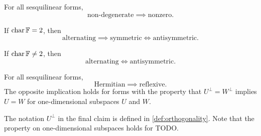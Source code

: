 \begin{lemma}
    \begin{enumlemma}
        \item For all sesquilinear forms,
        \begin{equation*}
            \text{non-degenerate}
                \implies \text{nonzero}.
        \end{equation*}

        \item If $\operatorname{char} \mathbb{F} = 2$, then
        \begin{equation*}
            \text{alternating}
                \implies \text{symmetric}
                \iff \text{antisymmetric}.
        \end{equation*}

        \item If $\operatorname{char} \mathbb{F} \neq 2$, then
        \begin{equation*}
            \text{alternating}
                \iff \text{antisymmetric}.
        \end{equation*}

        \item \label{enum:Hermitian-implies-reflexive} For all sesquilinear forms,
        \begin{equation*}
            \text{Hermitian}
                \implies \text{reflexive}.
        \end{equation*}
        The opposite implication holds for forms with the property that $U^\perp = W^\perp$ implies $U = W$ for one-dimensional subspaces $U$ and $W$.
    \end{enumlemma}
\end{lemma}
%
The notation $U^\perp$ in the final claim is defined in \cref{def:orthogonality}. Note that the property on one-dimensional subspaces holds for TODO.


